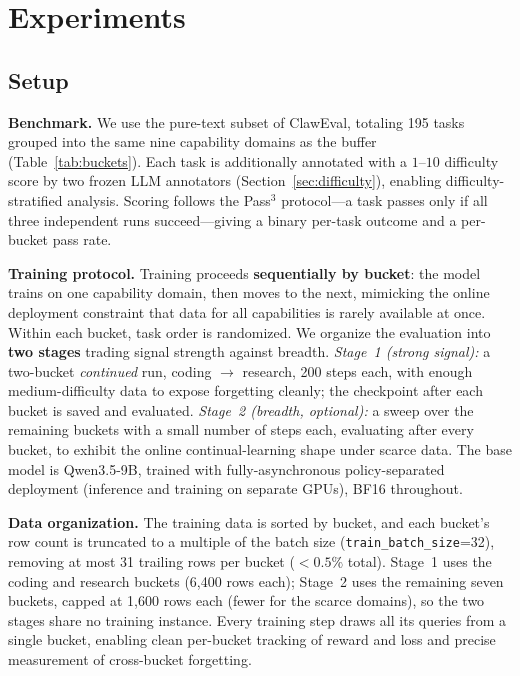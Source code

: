 \section{Experiments}
\label{sec:experiments}

\subsection{Setup}

\textbf{Benchmark.} We use the pure-text subset of ClawEval, totaling 195 tasks grouped into the same nine capability domains as the buffer (Table~\ref{tab:buckets}). Each task is additionally annotated with a $1$--$10$ difficulty score by two frozen LLM annotators (Section~\ref{sec:difficulty}), enabling difficulty-stratified analysis. Scoring follows the Pass$^3$ protocol---a task passes only if all three independent runs succeed---giving a binary per-task outcome and a per-bucket pass rate.

\textbf{Training protocol.} Training proceeds \textbf{sequentially by bucket}: the model trains on one capability domain, then moves to the next, mimicking the online deployment constraint that data for all capabilities is rarely available at once. Within each bucket, task order is randomized. We organize the evaluation into \textbf{two stages} trading signal strength against breadth. \emph{Stage~1 (strong signal):} a two-bucket \emph{continued} run, coding $\rightarrow$ research, 200 steps each, with enough medium-difficulty data to expose forgetting cleanly; the checkpoint after each bucket is saved and evaluated. \emph{Stage~2 (breadth, optional):} a sweep over the remaining buckets with a small number of steps each, evaluating after every bucket, to exhibit the online continual-learning shape under scarce data. The base model is Qwen3.5-9B, trained with fully-asynchronous policy-separated deployment (inference and training on separate GPUs), BF16 throughout.

\textbf{Data organization.} The training data is sorted by bucket, and each bucket's row count is truncated to a multiple of the batch size (\texttt{train\_batch\_size}=32), removing at most 31 trailing rows per bucket ($<0.5\%$ total). Stage~1 uses the coding and research buckets (6{,}400 rows each); Stage~2 uses the remaining seven buckets, capped at 1{,}600 rows each (fewer for the scarce domains), so the two stages share no training instance. Every training step draws all its queries from a single bucket, enabling clean per-bucket tracking of reward and loss and precise measurement of cross-bucket forgetting.

